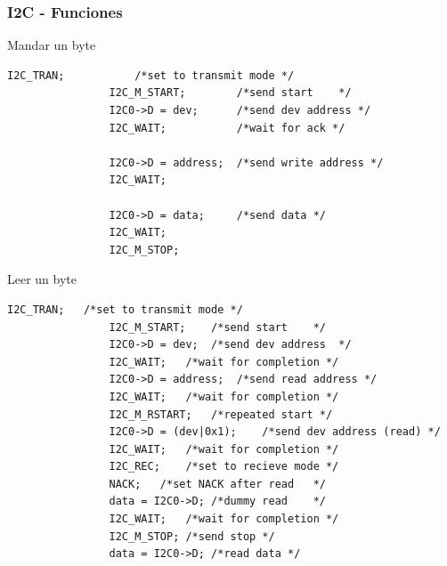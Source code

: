\documentclass[10.5pt,scale=1.0,t,aspectratio=169,hyperref={pdfpagelabels=false}]{beamer}
\begin{document}
\begin{frame}[fragile]
	\frametitle{I2C - Funciones}
	{\small
		\begin{multicols}{2}
			Mandar un byte
			\begin{lstlisting}[style=CStyle]
				I2C_TRAN;			/*set to transmit mode */
				I2C_M_START;		/*send start	*/
				I2C0->D = dev;  	/*send dev address */
				I2C_WAIT;	 		/*wait for ack */
				
				I2C0->D = address;	/*send write address */
				I2C_WAIT;
				
				I2C0->D = data;		/*send data	*/
				I2C_WAIT;
				I2C_M_STOP;
			\end{lstlisting}
			
			Leer un byte
			\begin{lstlisting}[style=CStyle]
				I2C_TRAN;	/*set to transmit mode */
				I2C_M_START;	/*send start	*/
				I2C0->D = dev;	/*send dev address	*/
				I2C_WAIT;	/*wait for completion */
				I2C0->D = address;	/*send read address */
				I2C_WAIT;	/*wait for completion */
				I2C_M_RSTART;	/*repeated start */
				I2C0->D = (dev|0x1); 	/*send dev address (read) */
				I2C_WAIT;	/*wait for completion */
				I2C_REC;	/*set to recieve mode */
				NACK;	/*set NACK after read	*/
				data = I2C0->D;	/*dummy read	*/
				I2C_WAIT;	/*wait for completion */
				I2C_M_STOP;	/*send stop	*/
				data = I2C0->D;	/*read data	*/
				
			\end{lstlisting}
		\end{multicols}
}
\end{frame}
\end{document}
